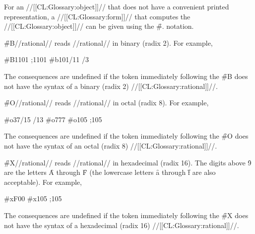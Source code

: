 For an //[[CL:Glossary:object]]// that does not have a convenient printed representation, a //[[CL:Glossary:form]]// that computes the //[[CL:Glossary:object]]// can be given using the \f{\#.} notation. 

\endsubsubsection%


  

\f{\#B}//rational// reads //rational// in binary (radix 2). For example, 

\code
 #B1101  ;1101\ssst
 #b101/11 /3 \endcode

 The consequences are undefined if the token immediately following the \f{\#B} does not have the syntax of a binary (\ie radix 2) //[[CL:Glossary:rational]]//.

\endsubsubsection%

  

\f{\#O}//rational// reads //rational// in octal (radix 8). For example, 

\code
 #o37/15 /13
 #o777 
 #o105  ;105\ssse \endcode

 The consequences are undefined if the token immediately following the \f{\#O} does not have the syntax of an octal (\ie radix 8) //[[CL:Glossary:rational]]//.

\endsubsubsection%

  

\f{\#X}//rational// reads //rational// in hexadecimal (radix 16). The digits above \f{9} are the letters \f{A} through \f{F} (the lowercase letters \f{a} through \f{f} are also acceptable).  For example,

\code
 #xF00              
 #x105  ;105\ssss \endcode

 The consequences are undefined if the token immediately following the \f{\#X} does not have the syntax of a hexadecimal (\ie radix 16) //[[CL:Glossary:rational]]//.

